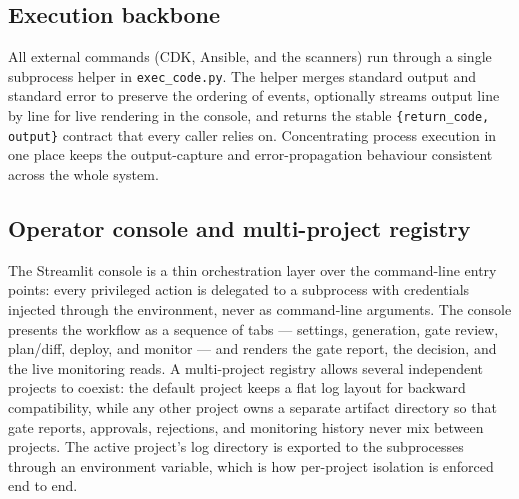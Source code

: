 \subsection{Execution backbone}
\label{subsec:impl-exec}

All external commands (CDK, Ansible, and the scanners) run through a single subprocess
helper in \texttt{exec\_code.py}. The helper merges standard output and standard error to
preserve the ordering of events, optionally streams output line by line for live
rendering in the console, and returns the stable \texttt{\{return\_code, output\}}
contract that every caller relies on. Concentrating process execution in one place keeps
the output-capture and error-propagation behaviour consistent across the whole system.



\subsection{Operator console and multi-project registry}
\label{subsec:impl-ui}

The Streamlit console is a thin orchestration layer over the command-line entry points:
every privileged action is delegated to a subprocess with credentials injected through
the environment, never as command-line arguments. The console presents the workflow as a
sequence of tabs --- settings, generation, gate review, plan/diff, deploy, and monitor
--- and renders the gate report, the decision, and the live monitoring reads. A
multi-project registry allows several independent projects to coexist: the default
project keeps a flat log layout for backward compatibility, while any other project owns
a separate artifact directory so that gate reports, approvals, rejections, and monitoring
history never mix between projects. The active project's log directory is exported to the
subprocesses through an environment variable, which is how per-project isolation is
enforced end to end.
